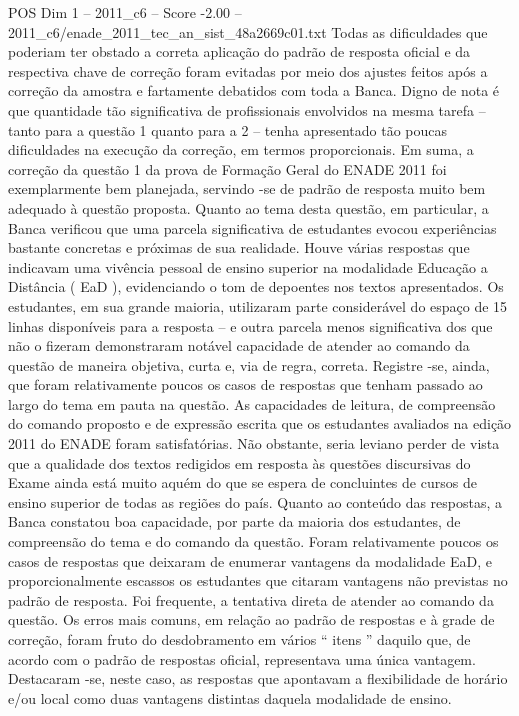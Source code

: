 \begin{textsample}{POS Dim 1 – 2011\_c6 – Score -2.00 – 2011\_c6/enade\_2011\_tec\_an\_sist\_48a2669c01.txt}
Todas as dificuldades que poderiam ter obstado a correta aplicação do padrão de resposta oficial e da respectiva chave de correção foram evitadas por meio dos ajustes feitos após a correção da amostra e fartamente debatidos com toda a Banca.
Digno de nota é que quantidade tão significativa de profissionais envolvidos na mesma tarefa – tanto para a questão 1 quanto para a 2 – tenha apresentado tão poucas dificuldades na execução da correção, em termos proporcionais.
Em suma, a correção da questão 1 da prova de Formação Geral do ENADE 2011 foi exemplarmente bem planejada, servindo -se de padrão de resposta muito bem adequado à questão proposta.
Quanto ao tema desta questão, em particular, a Banca verificou que uma parcela significativa de estudantes evocou experiências bastante concretas e próximas de sua realidade.
Houve várias respostas que indicavam uma vivência pessoal de ensino superior na modalidade Educação a Distância ( EaD ), evidenciando o tom de depoentes nos textos apresentados.
Os estudantes, em sua grande maioria, utilizaram parte considerável do espaço de 15 linhas disponíveis para a resposta – e outra parcela menos significativa dos que não o fizeram demonstraram notável capacidade de atender ao comando da questão de maneira objetiva, curta e, via de regra, correta.
Registre -se, ainda, que foram relativamente poucos os casos de respostas que tenham passado ao largo do tema em pauta na questão.
As capacidades de leitura, de compreensão do comando proposto e de expressão escrita que os estudantes avaliados na edição 2011 do ENADE foram satisfatórias.
Não obstante, seria leviano perder de vista que a qualidade dos textos redigidos em resposta às questões discursivas do Exame ainda está muito aquém do que se espera de concluintes de cursos de ensino superior de todas as regiões do país.
Quanto ao conteúdo das respostas, a Banca constatou boa capacidade, por parte da maioria dos estudantes, de compreensão do tema e do comando da questão.
Foram relativamente poucos os casos de respostas que deixaram de enumerar vantagens da modalidade EaD, e proporcionalmente escassos os estudantes que citaram vantagens não previstas no padrão de resposta.
Foi frequente, a tentativa direta de atender ao comando da questão.
Os erros mais comuns, em relação ao padrão de respostas e à grade de correção, foram fruto do desdobramento em vários “ itens ” daquilo que, de acordo com o padrão de respostas oficial, representava uma única vantagem.
Destacaram -se, neste caso, as respostas que apontavam a flexibilidade de horário e/ou local como duas vantagens distintas daquela modalidade de ensino.

\end{textsample}
